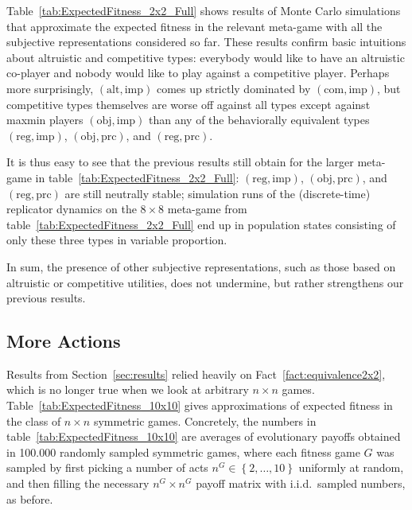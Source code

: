 \documentclass[fleqn,reqno,12pt]{article}
\theoremstyle{Satz}
\theoremstyle{Bsp}
\newcommand{\set}[1]{\left\{#1\right\}}
\newcommand{\myalert}[1]{\textcolor{red}{#1}}
\begin{document}
Table~\ref{tab:ExpectedFitness_2x2_Full} shows results of Monte Carlo simulations that
approximate the expected fitness in the relevant meta-game with all the subjective representations considered so
far. These results confirm basic intuitions about altruistic and competitive types: everybody would like to have an altruistic co-player and nobody
would like to play against a competitive player. Perhaps more surprisingly, $(\text{alt}, \text{imp})$
comes up strictly dominated by $(\text{com}, \text{imp})$, but competitive types themselves are worse off
against all types except against maxmin players $(\text{obj}, \text{imp})$ than any of
the behaviorally equivalent types $(\text{reg}, \text{imp})$, $(\text{obj}, \text{prc})$, and
$(\text{reg}, \text{prc})$.
\iffalse This is a noteworthy results in the light of the fact
that evolving altruistic preferences have been shown to support cooperative behavior in a
single stage game \myalert{[CITE]}. In contrast, averaging over payoffs in multiple stage
games, like we do here, makes altruistic preferences prime victims of evolutionary eradication.
\fi
It is thus easy to see that the previous results still obtain for the larger meta-game in
table~\ref{tab:ExpectedFitness_2x2_Full}: $(\text{reg}, \text{imp})$,
$(\text{obj}, \text{prc})$, and $(\text{reg}, \text{prc})$ are still neutrally stable;
simulation runs of the (discrete-time) replicator dynamics on the $8 \times 8$ meta-game from
table~\ref{tab:ExpectedFitness_2x2_Full} end up in population states consisting of only these
three types in variable proportion.

In sum, the presence of other subjective representations, such as those based on altruistic or competitive utilities, does not undermine, but rather strengthens our previous results.


                                   
\subsection{More Actions}
\label{sec:n-times-n}

Results from Section~\ref{sec:results} relied heavily on Fact~\ref{fact:equivalence2x2}, which
is no longer true when we look at arbitrary $n \times n$ games.
Table~\ref{tab:ExpectedFitness_10x10} gives approximations of expected fitness in the class of
$n \times n$ symmetric games. Concretely, the numbers in table~\ref{tab:ExpectedFitness_10x10}
are averages of evolutionary payoffs obtained in 100.000 randomly sampled symmetric games,
where each fitness game $G$ was sampled by first picking a number of acts $n^G \in \set{2, \dots, 10}$
uniformly at random, and then filling the necessary $n^G \times n^G$ payoff matrix with
i.i.d.~sampled numbers, as before.
\end{document}
